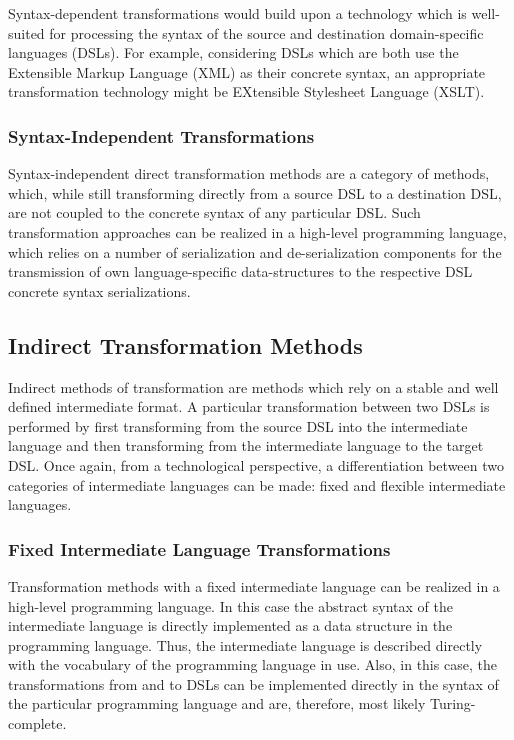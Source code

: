 Syntax-dependent transformations would build upon a technology which is well-suited for processing the syntax of the source and destination domain-specific languages (DSLs). For example, considering DSLs which are both use the Extensible Markup Language (XML) as their concrete syntax, an appropriate transformation technology might be EXtensible Stylesheet Language (XSLT).

\subsubsection{Syntax-Independent Transformations}

Syntax-independent direct transformation methods are a category of methods, which, while still transforming directly from a source DSL to a destination DSL, are not coupled to the concrete syntax of any particular DSL. Such transformation approaches can be realized in a high-level programming language, which relies on a number of serialization and de-serialization components for the transmission of own language-specific data-structures to the respective DSL concrete syntax serializations.

\subsection{Indirect Transformation Methods}

Indirect methods of transformation are methods which rely on a stable and well defined intermediate format. A particular transformation between two DSLs is performed by first transforming from the source DSL into the intermediate language and then transforming from the intermediate language to the target DSL. Once again, from a technological perspective, a differentiation between two categories of intermediate languages can be made: fixed and flexible intermediate languages.

\subsubsection{Fixed Intermediate Language Transformations}

Transformation methods with a fixed intermediate language can be realized in a high-level programming language. In this case the abstract syntax of the intermediate language is directly implemented as a data structure in the programming language. Thus, the intermediate language is described directly with the vocabulary of the programming language in use. Also, in this case, the transformations from and to DSLs can be implemented directly in the syntax of the particular programming language and are, therefore, most likely Turing-complete.

